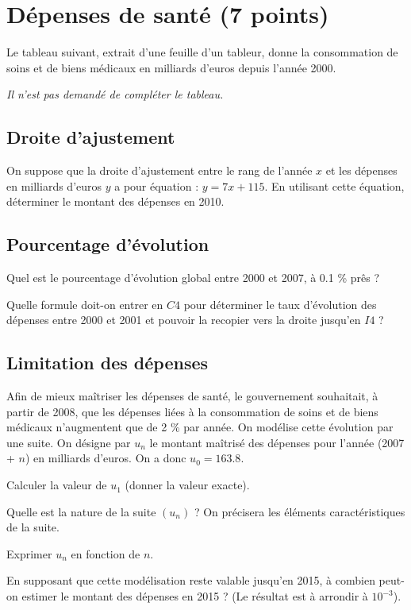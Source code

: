 
\section{Dépenses de santé (7 points)}

Le tableau suivant, extrait d'une feuille d'un tableur, donne la consommation de soins et de biens médicaux en milliards d'euros depuis l'année 2000.

\emph{Il n'est pas demandé de compléter le tableau.}

\subsection{Droite d'ajustement}

\begin{questions}
	\question[1] On suppose que la droite d'ajustement entre le rang de l'année $x$ et les dépenses en milliards d'euros $y$ a pour équation : $y = 7x + 115$. En utilisant cette équation, déterminer le montant des dépenses en 2010. 

\end{questions}

\subsection{Pourcentage d'évolution}

\begin{questions}
	\question[1] Quel est le pourcentage d'évolution global entre 2000 et 2007, à \num{0.1} \% prês ? 

	\question[1] Quelle formule doit-on entrer en $C4$ pour déterminer le taux d'évolution des dépenses entre 2000 et 2001 et pouvoir la recopier vers la droite jusqu'en $I4$ ?
\end{questions}

\subsection{Limitation des dépenses}

Afin de mieux maîtriser les dépenses de santé, le gouvernement souhaitait, à partir de 2008, que les dépenses liées à la consommation de soins et de biens médicaux n'augmentent que de 2 \% par année. On modélise cette évolution par une suite. On désigne par $u_n$ le montant maîtrisé des dépenses pour l'année (2007 + $n$) en milliards d'euros. On a donc $u_0 = \num{163.8}$.

\begin{questions}
	\question[1] Calculer la valeur de $u_1$ (donner la valeur exacte). 
	
	\question[1] Quelle est la nature de la suite $(u_n)$ ? On précisera les éléments caractéristiques de la suite.
	
	\question[1] Exprimer $u_n$ en fonction de $n$.
	
	\question[1] En supposant que cette modélisation reste valable jusqu'en 2015, à combien peut-on estimer le montant des dépenses en 2015 ? (Le résultat est à arrondir à $10^{-3}$).
\end{questions}

  